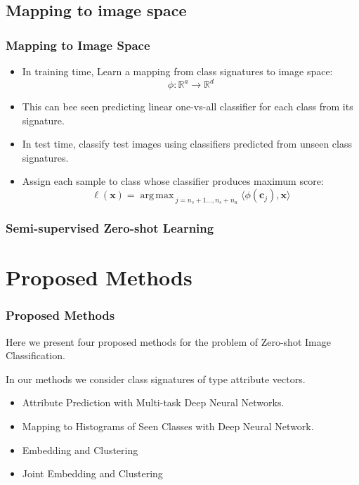 \documentclass{beamer}
\DeclareMathOperator*{\argmax}{arg\,max\,}
\begin{document}
\subsection{Mapping to image space}
\begin{frame}
  \frametitle{Mapping to Image Space}
\begin{itemize}
    \item In training time, Learn a mapping from class signatures to image space:
    \[ \phi: \mathbb{R}^{a} \to \mathbb{R}^d \]
    \item This can bee seen predicting linear one-vs-all classifier for each class from its signature.
    \item In test time, classify test images using classifiers predicted from unseen class signatures.
    \item Assign each sample to class whose classifier produces maximum score:
    \begin{equation}
      \ell(\mathbf{x}) = \argmax_{j=n_s+1 \ldots, n_s + n_u} \langle \phi(\mathbf{c}_j), \mathbf{x} \rangle
    \end{equation}
\end{itemize}
\end{frame}

\begin{frame}\frametitle{Semi-supervised Zero-shot Learning}
\end{frame}

\section{Proposed Methods}
\begin{frame}\frametitle{Proposed Methods}
Here we present four proposed methods for the problem of Zero-shot Image Classification.

In our methods we consider class signatures of type attribute vectors.

\begin{itemize}
  \item Attribute Prediction with Multi-task Deep Neural Networks.
  \item Mapping to Histograms of Seen Classes with Deep Neural Network.
  \item Embedding and Clustering
  \item Joint Embedding and Clustering
\end{itemize}
\end{frame}
\end{document}
